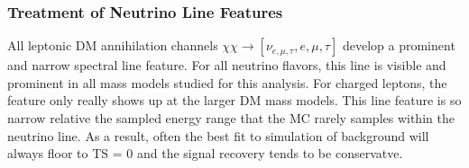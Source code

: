 \subsubsection{Treatment of Neutrino Line Features}\label{sec:icDM_nu_lines}

All leptonic DM annihilation channels $ \chi\chi \rightarrow [\nu_{e, \mu, \tau}, e, \mu,\tau] $ develop a prominent and narrow spectral line feature.
For all neutrino flavors, this line is visible and prominent in all mass models studied for this analysis.
For charged leptons, the feature only really shows up at the larger DM mass models.
This line feature is so narrow relative the sampled energy range that the MC rarely samples within the neutrino line.
As a result, often the best fit to simulation of background will always floor to TS = 0 and the signal recovery tends to be conservatve.

